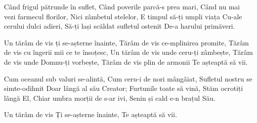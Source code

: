\beginverse
Când frigul pătrunde în suflet,
Când poverile parcă-s prea mari,
Când nu mai vezi farmecul florilor,
Nici zâmbetul stelelor,
E timpul să-ți umpli viața
Cu-ale cerului dulci adieri,
Să-ți lași scăldat sufletul ostenit
De-a harului primăveri.
\endverse

\beginchorus
Un tărâm de vis ți se-așterne înainte,
Tărâm de vis ce-mplinirea promite,
Tărâm de vis cu îngerii mii ce te însoțesc,
Un tărâm de vis unde ceru-ți zâmbește,
Tărâm de vis unde Domnu-ți vorbește,
Tărâm de vis plin de armonii
Te așteaptă să vii.
\endchorus

\beginverse
Cum oceanul sub valuri se-alintă,
Cum ceru-i de nori mângâiat,
Sufletul nostru se simte-odihnit
Doar lângă al său Creator;
Furtunile toate să vină,
Stăm ocrotiți lângă El,
Chiar umbra morții de s-ar ivi,
Senin și cald e-n brațul Său.
\endverse

\beginverse*
Un tărâm de vis
Ți se-așterne înainte,
Te așteaptă să vii.
\endverse
\endsong
